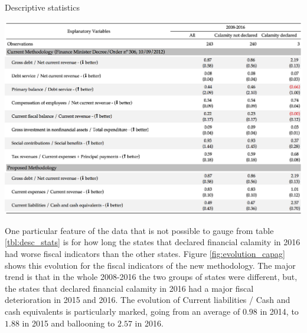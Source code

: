 \begin{table}[!ht]
\centering
\caption{Descriptive statistics} \label{tbl:desc_stats}
\includegraphics[scale=0.50]{tables/desc_stats.png}
\end{table}

One particular feature of the data that is not possible to gauge from table \ref{tbl:desc_stats} is for how long the states that declared financial calamity in 2016 had worse fiscal indicators than the other states. Figure \ref{fig:evolution_capag} shows this evolution for the fiscal indicators of the new methodology. The major trend is that in the whole 2008-2016 the two groups of states were different, but, the states that declared financial calamity in 2016 had a major fiscal deterioration in 2015 and 2016. The evolution of Current liabilities / Cash and cash equivalents is particularly marked, going from an average of $0.98$ in 2014, to $1.88$ in 2015 and ballooning to $2.57$ in 2016.

